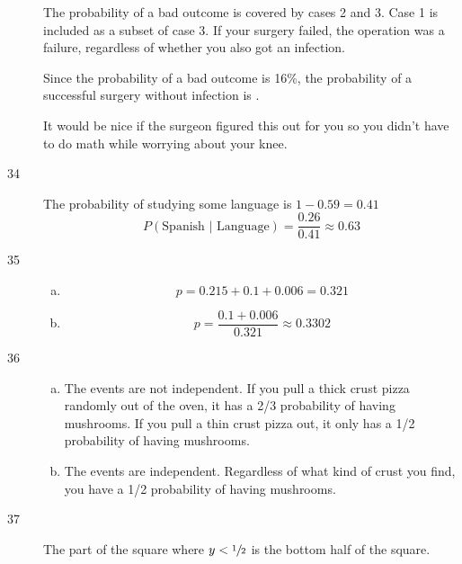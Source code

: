 \documentclass[letterpaper, landscape]{exam}
\begin{document}
\begin{description}
        The probability of a bad outcome is covered by cases 2 and 3. Case 1 is
        included as a subset of case 3. If your surgery failed, the operation
        was a failure, regardless of whether you also got an infection.

        Since the probability of a bad outcome is 16\%, the probability of a
        successful surgery without infection is .

        It would be nice if the surgeon figured this out for you so you didn't
        have to do math while worrying about your knee.


      \item[34]
        The probability of studying some language is $1 - 0.59 = 0.41$
        \[
          P(\text{Spanish } | \text{ Language}) = \frac{0.26}{0.41} 
            \approx \boxed{ 0.63 }
        \]

      \item[35]
        \begin{enumerate}[(a)]
          \item 
            \[
              p = 0.215 + 0.1 + 0.006 = \boxed{ 0.321 }
            \]

          \item
            \[
              p = \frac{0.1 + 0.006}{0.321} \approx \boxed{ 0.3302 }
            \]
        \end{enumerate}

      \item[36]
        \begin{enumerate}[(a)]
          \item The events are not independent. If you pull a thick crust pizza
            randomly out of the oven, it has a 2/3 probability of having
            mushrooms. If you pull a thin crust pizza out, it only has a 1/2
            probability of having mushrooms.

          \item The events are independent. Regardless of what kind of crust you
            find, you have a 1/2 probability of having mushrooms.
        \end{enumerate}

      \item[37]
        The part of the square where $y < \sfrac{1}{2}$ is the bottom half of the
        square.


\end{description}
\end{document}
